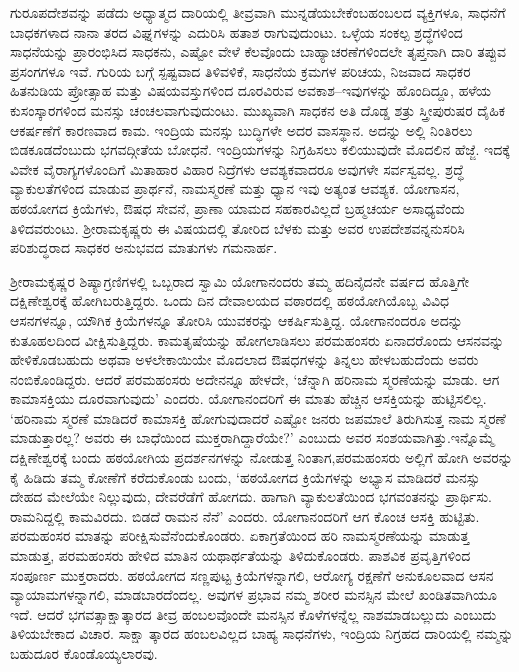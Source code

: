 
ಗುರೂಪದೇಶವನ್ನು ಪಡೆದು ಅಧ್ಯಾತ್ಮದ ದಾರಿಯಲ್ಲಿ ತೀವ್ರವಾಗಿ ಮುನ್ನಡೆಯಬೇಕೆಂಬ\break ಹಂಬಲದ ವ್ಯಕ್ತಿಗಳೂ, ಸಾಧನೆಗೆ ಬಾಧಕಗಳಾದ ನಾನಾ ತರದ ವಿಘ್ನಗಳನ್ನು ಎದುರಿಸಿ ಹತಾಶ ರಾಗುವುದುಂಟು. ಒಳ್ಳೆಯ ಸಂಕಲ್ಪ ಶ್ರದ್ಧೆಗಳಿಂದ ಸಾಧನೆಯನ್ನು ಪ್ರಾರಂಭಿಸಿದ ಸಾಧಕನು, ಎಷ್ಟೋ ವೇಳೆ ಕೆಲವೊಂದು ಬಾಹ್ಯಾಚರಣೆಗಳಿಂದಲೇ ತೃಪ್ತನಾಗಿ ದಾರಿ ತಪ್ಪುವ ಪ್ರಸಂಗಗಳೂ ಇವೆ. ಗುರಿಯ ಬಗ್ಗೆ ಸ್ಪಷ್ಟವಾದ ತಿಳಿವಳಿಕೆ, ಸಾಧನೆಯ ಕ್ರಮಗಳ ಪರಿಚಯ, ನಿಜವಾದ ಸಾಧಕರ ಹಿತನುಡಿಯ ಪ್ರೋತ್ಸಾಹ ಮತ್ತು ವಿಷಯವಸ್ತುಗಳಿಂದ ದೂರವಿರುವ ಅವಕಾಶ–ಇವುಗಳನ್ನು ಹೊಂದಿದ್ದೂ, ಹಳೆಯ ಕುಸಂಸ್ಕಾರಗಳಿಂದ ಮನಸ್ಸು ಚಂಚಲವಾಗುವುದುಂಟು. ಮುಖ್ಯವಾಗಿ ಸಾಧಕನ ಅತಿ ದೊಡ್ಡ ಶತ್ರು ಸ್ತ್ರೀಪುರುಷರ ದೈಹಿಕ ಆಕರ್ಷಣೆಗೆ ಕಾರಣವಾದ ಕಾಮ. ಇಂದ್ರಿಯ ಮನಸ್ಸು ಬುದ್ಧಿಗಳೇ ಅದರ ವಾಸಸ್ಥಾನ. ಅದನ್ನು ಅಲ್ಲಿ ನಿಂತಿರಲು ಬಿಡಕೂಡದೆಂಬುದು ಭಗವದ್ಗೀತೆಯ ಬೋಧನೆ. ಇಂದ್ರಿಯಗಳನ್ನು ನಿಗ್ರಹಿಸಲು ಕಲಿಯುವುದೇ ಮೊದಲಿನ ಹೆಜ್ಜೆ. ಇದಕ್ಕೆ ವಿವೇಕ ವೈರಾಗ್ಯಗಳೊಂದಿಗೆ ಮಿತಾಹಾರ ವಿಹಾರ ನಿದ್ರೆಗಳು ಆವಶ್ಯಕವಾದರೂ ಅವುಗಳೇ ಸರ್ವಸ್ವವಲ್ಲ. ಶ್ರದ್ಧೆ ವ್ಯಾಕುಲತೆಗಳಿಂದ ಮಾಡುವ ಪ್ರಾರ್ಥನೆ, ನಾಮಸ್ಮರಣೆ ಮತ್ತು ಧ್ಯಾನ ಇವು ಅತ್ಯಂತ ಆವಶ್ಯಕ. ಯೋಗಾಸನ, ಹಠಯೋಗದ ಕ್ರಿಯೆಗಳು, ಔಷಧ ಸೇವನೆ, ಪ್ರಾಣಾ ಯಾಮದ ಸಹಕಾರವಿಲ್ಲದೆ ಬ್ರಹ್ಮಚರ್ಯ ಅಸಾಧ್ಯವೆಂದು ತಿಳಿದವರುಂಟು. ಶ‍್ರೀರಾಮಕೃಷ್ಣರು ಈ ವಿಷಯದಲ್ಲಿ ತೋರಿದ ಬೆಳಕು ಮತ್ತು ಅವರ ಉಪದೇಶವನ್ನನುಸರಿಸಿ ಪರಿಶುದ್ಧರಾದ ಸಾಧಕರ ಅನುಭವದ ಮಾತುಗಳು ಗಮನಾರ್ಹ.

ಶ‍್ರೀರಾಮಕೃಷ್ಣರ ಶಿಷ್ಯಾಗ್ರಣಿಗಳಲ್ಲಿ ಒಬ್ಬರಾದ ಸ್ವಾಮಿ ಯೋಗಾನಂದರು ತಮ್ಮ ಹದಿನೈದನೇ ವರ್ಷದ ಹೊತ್ತಿಗೇ ದಕ್ಷಿಣೇಶ್ವರಕ್ಕೆ ಹೋಗಿಬರುತ್ತಿದ್ದರು. ಒಂದು ದಿನ ದೇವಾಲಯದ ವಠಾರದಲ್ಲಿ ಹಠಯೋಗಿಯೊಬ್ಬ ವಿವಿಧ ಆಸನಗಳನ್ನೂ, ಯೌಗಿಕ ಕ್ರಿಯೆಗಳನ್ನೂ ತೋರಿಸಿ ಯುವಕರನ್ನು ಆಕರ್ಷಿಸುತ್ತಿದ್ದ. ಯೋಗಾನಂದರೂ ಅದನ್ನು ಕುತೂಹಲದಿಂದ ವೀಕ್ಷಿಸುತ್ತಿದ್ದರು. ಕಾಮತೃಷೆಯನ್ನು ಹೋಗಲಾಡಿಸಲು ಪರಮಹಂಸರು ಏನಾದರೊಂದು ಆಸನವನ್ನು ಹೇಳಿಕೊಡಬಹುದು ಅಥವಾ ಅಳಲೇಕಾಯಿಯೇ ಮೊದಲಾದ ಔಷಧಗಳನ್ನು ತಿನ್ನಲು ಹೇಳಬಹುದೆಂದು ಅವರು ನಂಬಿಕೊಂಡಿದ್ದರು. ಆದರೆ ಪರಮಹಂಸರು ಅದೇನನ್ನೂ ಹೇಳದೇ, ‘ಚೆನ್ನಾಗಿ ಹರಿನಾಮ ಸ್ಮರಣೆಯನ್ನು ಮಾಡು. ಆಗ ಕಾಮಾಸಕ್ತಿಯು ದೂರವಾಗುವುದು’ ಎಂದರು. ಯೋಗಾನಂದರಿಗೆ ಈ ಮಾತು ಹೆಚ್ಚಿನ ಆಸಕ್ತಿಯನ್ನು ಹುಟ್ಟಿಸಲಿಲ್ಲ. ‘ಹರಿನಾಮ ಸ್ಮರಣೆ ಮಾಡಿದರೆ ಕಾಮಾಸಕ್ತಿ ಹೋಗುವುದಾದರೆ ಎಷ್ಟೋ ಜನರು ಜಪಮಾಲೆ ತಿರುಗಿಸುತ್ತ ನಾಮ ಸ್ಮರಣೆ ಮಾಡುತ್ತಾರಲ್ಲ? ಅವರು ಈ ಬಾಧೆಯಿಂದ ಮುಕ್ತರಾಗಿದ್ದಾರೆಯೇ?’ ಎಂಬುದು ಅವರ ಸಂಶಯವಾಗಿತ್ತು.\break ಇನ್ನೊಮ್ಮೆ ದಕ್ಷಿಣೇಶ್ವರಕ್ಕೆ ಬಂದು ಹಠಯೋಗಿಯ ಪ್ರದರ್ಶನಗಳನ್ನು ನೋಡುತ್ತ ನಿಂತಾಗ,\break ಪರಮಹಂಸರು ಅಲ್ಲಿಗೆ ಹೋಗಿ ಅವರನ್ನು ಕೈ ಹಿಡಿದು ತಮ್ಮ ಕೋಣೆಗೆ ಕರೆದುಕೊಂಡು ಬಂದು, ‘ಹಠಯೋಗದ ಕ್ರಿಯೆಗಳನ್ನು ಅಭ್ಯಾಸ ಮಾಡಿದರೆ ಮನಸ್ಸು ದೇಹದ ಮೇಲೆಯೇ ನಿಲ್ಲುವುದು, ದೇವರೆಡೆಗೆ ಹೋಗದು. ಹಾಗಾಗಿ ವ್ಯಾಕುಲತೆಯಿಂದ ಭಗವಂತನನ್ನು ಪ್ರಾರ್ಥಿಸು. ರಾಮನಿದ್ದಲ್ಲಿ ಕಾಮವಿರದು. ಬಿಡದೆ ರಾಮನ ನೆನೆ’ ಎಂದರು. ಯೋಗಾನಂದರಿಗೆ ಆಗ ಕೊಂಚ ಆಸಕ್ತಿ ಹುಟ್ಟಿತು. ಪರಮಹಂಸರ ಮಾತನ್ನು ಪರೀಕ್ಷಿಸುವೆನೆಂದುಕೊಂಡರು. ಏಕಾಗ್ರತೆಯಿಂದ ಹರಿ ನಾಮಸ್ಮರಣೆಯನ್ನು ಮಾಡುತ್ತ ಮಾಡುತ್ತ, ಪರಮಹಂಸರು ಹೇಳಿದ ಮಾತಿನ ಯಥಾರ್ಥತೆ\-\break ಯನ್ನು ತಿಳಿದುಕೊಂಡರು. ಪಾಶವಿಕ ಪ್ರವೃತ್ತಿಗಳಿಂದ ಸಂಪೂರ್ಣ ಮುಕ್ತರಾದರು. ಹಠಯೋಗದ ಸಣ್ಣಪುಟ್ಟ ಕ್ರಿಯೆಗಳನ್ನಾಗಲಿ, ಆರೋಗ್ಯ ರಕ್ಷಣೆಗೆ ಅನುಕೂಲವಾದ ಆಸನ ವ್ಯಾಯಾಮ\-ಗಳನ್ನಾ\-ಗಲಿ, ಮಾಡಬಾರದೆಂದಲ್ಲ. ಅವುಗಳ ಪ್ರಭಾವ ನಮ್ಮ ಶರೀರ ಮನಸ್ಸಿನ ಮೇಲೆ ಖಂಡಿತವಾಗಿಯೂ ಇದೆ. ಆದರೆ ಭಗವತ್ಸಾಕ್ಷಾತ್ಕಾರದ ತೀವ್ರ ಹಂಬಲವೊಂದೇ ಮನಸ್ಸಿನ ಕೊಳೆಗಳನ್ನೆಲ್ಲ ನಾಶಮಾಡ\-ಬಲ್ಲುದು ಎಂಬುದು ತಿಳಿಯಬೇಕಾದ ವಿಚಾರ. ಸಾಕ್ಷಾ ತ್ಕಾರದ ಹಂಬಲವಿಲ್ಲದ ಬಾಹ್ಯ ಸಾಧನೆಗಳು, ಇಂದ್ರಿಯ ನಿಗ್ರಹದ ದಾರಿಯಲ್ಲಿ ನಮ್ಮನ್ನು ಬಹುದೂರ ಕೊಂಡೊಯ್ಯಲಾರವು.

